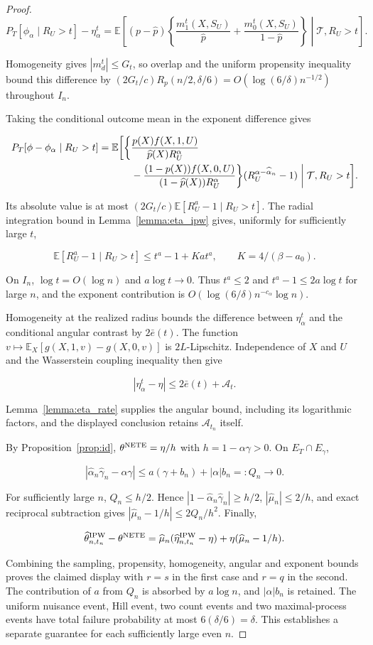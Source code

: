 \documentclass[12pt]{article}
\theoremstyle{plain}
\theoremstyle{definition}
\begin{document}
\begin{proof}
\[
P_T[\phi_\alpha\mid R_U>t]-\eta_\alpha^t=\mathbb E\left[(p-\hat p)\left\{\frac{m_1^t(X,S_U)}{\hat p}+\frac{m_0^t(X,S_U)}{1-\hat p}\right\}\middle|\mathcal T,R_U>t\right].
\]

Homogeneity gives $|m_d^t|\leq G_t$, so overlap and the uniform propensity inequality bound this difference by $(2G_t/c)R_p(n/2,\delta/6)=O(\log(6/\delta)n^{-1/2})$ throughout $I_n$.

Taking the conditional outcome mean in the exponent difference gives

\[
\begin{aligned}
P_T[\phi-\phi_\alpha\mid R_U>t]=\mathbb E\biggl[\biggl\{&\frac{p(X)f(X,1,U)}{\hat p(X)R_U^\alpha}\\
&-\frac{(1-p(X))f(X,0,U)}{(1-\hat p(X))R_U^\alpha}\biggr\}(R_U^{\alpha-\hat\alpha_n}-1)\biggm|\mathcal T,R_U>t\biggr].
\end{aligned}
\]

Its absolute value is at most $(2G_t/c)\mathbb E[R_U^a-1\mid R_U>t]$. The radial integration bound in Lemma~\ref{lemma:eta_ipw} gives, uniformly for sufficiently large $t$,

\[
\mathbb E[R_U^a-1\mid R_U>t]\leq t^a-1+Kat^a,\qquad K=4/(\beta-a_0).
\]

On $I_n$, $\log t=O(\log n)$ and $a\log t\to0$. Thus $t^a\leq2$ and $t^a-1\leq2a\log t$ for large $n$, and the exponent contribution is $O(\log(6/\delta)n^{-c_\alpha}\log n)$.

Homogeneity at the realized radius bounds the difference between $\eta_\alpha^t$ and the conditional angular contrast by $2\bar e(t)$. The function $v\mapsto\mathbb E_X[g(X,1,v)-g(X,0,v)]$ is $2L$-Lipschitz. Independence of $X$ and $U$ and the Wasserstein coupling inequality then give

\[
|\eta_\alpha^t-\eta|\leq2\bar e(t)+\mathcal A_t.
\]

Lemma~\ref{lemma:eta_rate} supplies the angular bound, including its logarithmic factors, and the displayed conclusion retains $\mathcal A_{t_n}$ itself.

By Proposition~\ref{prop:id}, $\theta^{\tmop{NETE}}=\eta/h$ with $h=1-\alpha\gamma>0$. On $E_T\cap E_\gamma$,

\[
|\hat\alpha_n\hat\gamma_n-\alpha\gamma|\leq a(\gamma+b_n)+|\alpha|b_n=:Q_n\to0.
\]

For sufficiently large $n$, $Q_n\leq h/2$. Hence $|1-\hat\alpha_n\hat\gamma_n|\geq h/2$, $|\hat\mu_n|\leq2/h$, and exact reciprocal subtraction gives $|\hat\mu_n-1/h|\leq2Q_n/h^2$. Finally,

\[
\widehat\theta_{n,t_n}^{\text{IPW}}-\theta^{\tmop{NETE}}=\hat\mu_n(\hat\eta_{n,t_n}^{\text{IPW}}-\eta)+\eta(\hat\mu_n-1/h).
\]

Combining the sampling, propensity, homogeneity, angular and exponent bounds proves the claimed display with $r=s$ in the first case and $r=q$ in the second. The contribution of $a$ from $Q_n$ is absorbed by $a\log n$, and $|\alpha|b_n$ is retained. The uniform nuisance event, Hill event, two count events and two maximal-process events have total failure probability at most $6(\delta/6)=\delta$. This establishes a separate guarantee for each sufficiently large even $n$.
\end{proof}
\end{document}
